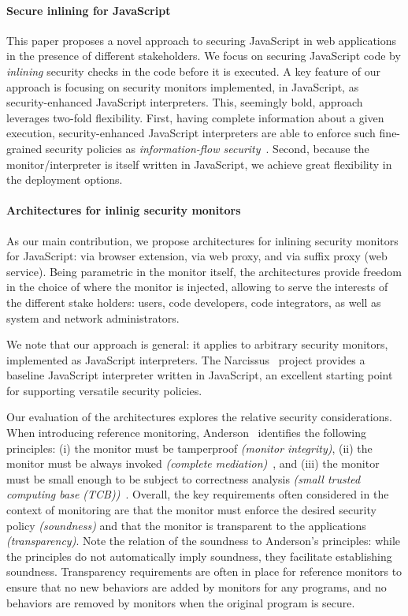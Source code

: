 \documentclass{llncs}
\begin{document}
\vspace{-.4cm}
\paragraph{Secure inlining for JavaScript}
This paper proposes a novel approach to securing JavaScript in web
applications in the presence of different stakeholders.
%
We focus on securing JavaScript code by \emph{inlining}
security checks in the code before it is executed.
%
A key feature
of our approach is focusing on security monitors implemented, in JavaScript, as
security-enhanced JavaScript interpreters.
This, seemingly bold, approach leverages two-fold
flexibility. First, having complete information about a given
execution, security-enhanced JavaScript interpreters are able to
enforce such fine-grained security policies as \emph{information-flow
security}~\cite{Sabelfeld:Myers:JSAC}. Second, because the monitor/interpreter is itself written in
JavaScript, we achieve great flexibility in the deployment options.

\vspace{-.4cm}
\paragraph{Architectures for inlinig security monitors}
As our main contribution,
we propose architectures for inlining security monitors for JavaScript: via
browser extension, via web proxy, and via suffix proxy (web service). 
%
Being parametric in the monitor itself,
the architectures provide freedom in the choice of where the monitor is
injected, allowing to serve the interests of the different stake
holders: users, code developers, code
integrators, as well as system and network administrators.

We note that our approach is general: it applies to arbitrary security
monitors, implemented as JavaScript interpreters. The 
 Narcissus~\cite{Narcissus} project provides a baseline JavaScript
 interpreter written in JavaScript, an excellent starting
 point for supporting versatile security policies.

Our evaluation of the architectures explores the relative security
considerations.
When introducing reference monitoring, Anderson~\cite{Anderson:72}
identifies the following principles:
(i) the monitor must be tamperproof \emph{(monitor integrity)},
(ii) the monitor must be always invoked \emph{(complete
  mediation)}~\cite{Saltzer:Schroeder:TCB}, and
(iii) the monitor must be small enough to be subject to correctness
analysis \emph{(small trusted computing base
  (TCB))}~\cite{Saltzer:Schroeder:TCB,DBLP:dblp_conf/sosp/Rushby81}. Overall,
the key requirements often considered in the context of monitoring are 
that the monitor must enforce the desired security policy
\emph{(soundness)} and that the monitor is transparent to the
applications \emph{(transparency)}. Note the relation of
the soundness to Anderson's principles: while the principles do not
automatically imply soundness, they facilitate establishing soundness. 
Transparency requirements are often in place for reference monitors to
ensure that no new behaviors are added by monitors for any programs, and no
behaviors are removed by monitors when the
original program is secure.
\end{document}
